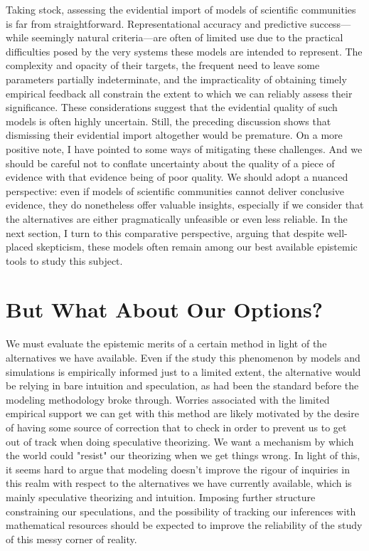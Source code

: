 \documentclass{article}
\begin{document}
Taking stock, assessing the evidential import of models of scientific communities is far from straightforward. Representational accuracy and predictive success—while seemingly natural criteria—are often of limited use due to the practical difficulties posed by the very systems these models are intended to represent. The complexity and opacity of their targets, the frequent need to leave some parameters partially indeterminate, and the impracticality of obtaining timely empirical feedback all constrain the extent to which we can reliably assess their significance. These considerations suggest that the evidential quality of such models is often highly uncertain. Still, the preceding discussion shows that dismissing their evidential import altogether would be premature. On a more positive note, I have pointed to some ways of mitigating these challenges. And we should be careful not to conflate uncertainty about the quality of a piece of evidence with that evidence being of poor quality. We should adopt a nuanced perspective: even if models of scientific communities cannot deliver conclusive evidence, they do nonetheless offer valuable insights, especially if we consider that the alternatives are either pragmatically unfeasible or even less reliable. In the next section, I turn to this comparative perspective, arguing that despite well-placed skepticism, these models often remain among our best available epistemic tools to study this subject.


\section{But What About Our Options?}


We must evaluate the epistemic merits of a certain method in light of the alternatives we have available. Even if the study this phenomenon by models and simulations is empirically informed just to a limited extent, the alternative would be relying in bare intuition and speculation, as had been the standard before the modeling methodology broke through. Worries associated with the limited empirical support we can get with this method are likely motivated by the desire of having some source of correction that to check in order to prevent us to get out of track when doing speculative theorizing. We want a mechanism by which the world could "resist" our theorizing when we get things wrong. In light of this, it seems hard to argue that modeling doesn't improve the rigour of inquiries in this realm with respect to the alternatives we have currently available, which is mainly speculative theorizing and intuition. Imposing further structure constraining our speculations, and the possibility of tracking our inferences with mathematical resources should be expected to improve the reliability of the study of this messy corner of reality. 
\end{document}
